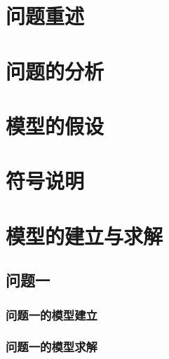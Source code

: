 \documentclass{../../../Template/cumcmthesis-2025} %
\title{} %
\begin{document}
\maketitle



\section{问题重述}





\section{问题的分析}





\section{模型的假设}





\section{符号说明}


\section{模型的建立与求解}

\subsection{问题一}

\subsubsection{问题一的模型建立}



\subsubsection{问题一的模型求解}


\end{document}
